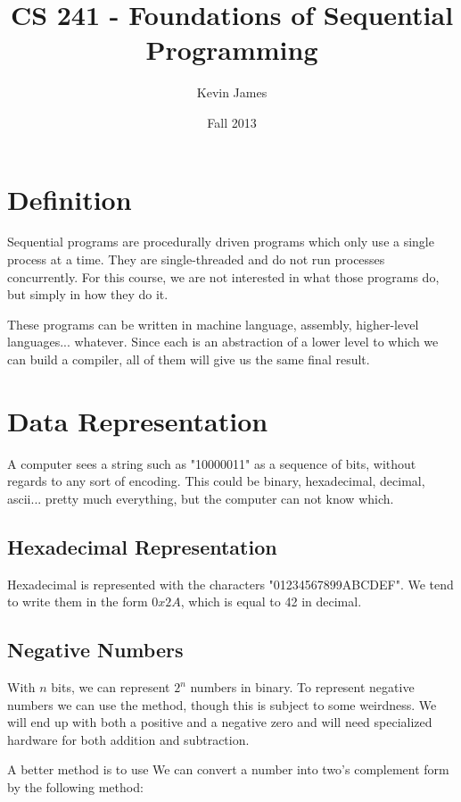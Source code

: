 \documentclass[12pt]{article}
\begin{document}
\title{CS 241 - Foundations of Sequential Programming}
\author{Kevin James}
\date{\vspace{-2ex}Fall 2013}
\maketitle\HRule

\section*{Definition}
Sequential programs are procedurally driven programs which only use a single process at a time. They are single-threaded and do not run processes concurrently. For this course, we are not interested in what those programs do, but simply in how they do it.

These programs can be written in machine language, assembly, higher-level languages... whatever. Since each is an abstraction of a lower level to which we can build a compiler, all of them will give us the same final result.

\section*{Data Representation}
A computer sees a string such as "10000011" as a sequence of bits, without regards to any sort of encoding. This could be binary, hexadecimal, decimal, ascii... pretty much everything, but the computer can not know which.

\subsection*{Hexadecimal Representation}
Hexadecimal is represented with the characters "01234567899ABCDEF". We tend to write them in the form $0x2A$, which is equal to 42 in decimal.

\subsection*{Negative Numbers}
With $n$ bits, we can represent $2^n$ numbers in binary. To represent negative numbers we can use the  method, though this is subject to some weirdness. We will end up with both a positive and a negative zero and will need specialized hardware for both addition and subtraction.

A better method is to use  We can convert a number into two's complement form by the following method:
\end{document}
